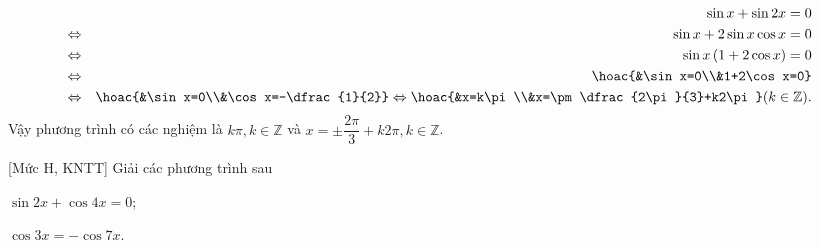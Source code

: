 \begin{bt}
{\begin{listEX}
\begin{eqnarray*}
				&&\sin x+\sin 2 x=0 \\
				&\Leftrightarrow& \sin x+2\sin x\cos x=0 \\
				&\Leftrightarrow& \sin x \left(1+2\cos x\right)=0 \\
				&\Leftrightarrow& \hoac{&\sin x=0\\&1+2\cos x=0} \\
				&\Leftrightarrow& \hoac{&\sin x=0\\&\cos x=-\dfrac{1}{2}}\Leftrightarrow \hoac{&x=k\pi\\&x=\pm \dfrac{2\pi}{3}+k2\pi} (k\in\mathbb{Z}).
			\end{eqnarray*}	
			Vậy phương trình có các nghiệm là $k\pi, k\in\mathbb{Z}$ và $x=\pm \dfrac{2\pi}{3}+k2\pi, k\in\mathbb{Z}$.
		\end{listEX}
	}
\end{bt}

\begin{bt}%
[Mức H, KNTT]%
	Giải các phương trình sau
	\begin{listEX}[2]
		\item $\sin2x+\cos4x=0$;
		\item $\cos3x=-\cos7x$.
	\end{listEX}
\end{bt}

